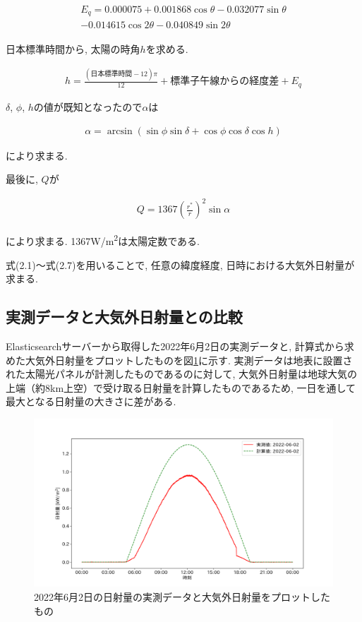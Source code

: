 \begin{eqnarray}
  \begin{split}
    E_q =  0.000075+0.001868\cos \theta-0.032077\sin \theta\\
    -0.014615\cos 2\theta-0.040849\sin 2\theta
  \end{split}
\end{eqnarray}

日本標準時間から, 太陽の時角$h$を求める.

\begin{eqnarray}
  h = \frac{(日本標準時間-12)\pi}{12}+標準子午線からの経度差+E_q
\end{eqnarray}

$\delta$, $\phi$, $h$の値が既知となったので$\alpha$は

\begin{eqnarray}
  \alpha = \arcsin (\sin \phi\sin \delta+\cos \phi\cos \delta\cos h)
\end{eqnarray}

により求まる.

最後に, $Q$が

\begin{eqnarray}
  Q = 1367(\frac{r^{*}}{r})^{2}\sin \alpha
\end{eqnarray}

により求まる. 1367\si{\watt}/\si{\metre\squared}は太陽定数である.

式(2.1)～式(2.7)を用いることで, 任意の緯度経度, 日時における大気外日射量が求まる.


\subsection{実測データと大気外日射量との比較}
Elasticsearchサーバーから取得した2022年6月2日の実測データと, 計算式から求めた大気外日射量をプロットしたものを図\ref{20220529-p1}に示す. 実測データは地表に設置された太陽光パネルが計測したものであるのに対して, 大気外日射量は地球大気の上端（約8km上空）で受け取る日射量を計算したものであるため, 一日を通して最大となる日射量の大きさに差がある.

\begin{figure}[h]
  \begin{center}
    \includegraphics[width=160mm]{sotu/figure/2/original-20220602-corr.png}
    \caption{2022年6月2日の日射量の実測データと大気外日射量をプロットしたもの}
    \label{20220529-p1}
  \end{center}
\end{figure}

